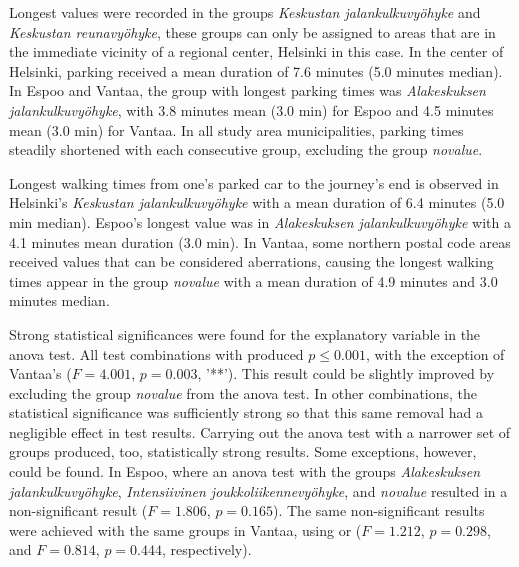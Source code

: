Longest  values were recorded in the groups \textit{Keskustan jalankulkuvyöhyke} and \textit{Keskustan reunavyöhyke}, these groups can only be assigned to areas that are in the immediate vicinity of a regional center, Helsinki in this case. In the center of Helsinki, parking received a mean duration of 7.6 minutes (5.0 minutes median). In Espoo and Vantaa, the group with longest parking times was \textit{Alakeskuksen jalankulkuvyöhyke}, with 3.8 minutes mean (3.0 min) for Espoo and 4.5 minutes mean (3.0 min) for Vantaa. In all study area municipalities, parking times steadily shortened with each consecutive group, excluding the group \textit{novalue}.

Longest walking times from one's parked car to the journey's end is observed in Helsinki's \textit{Keskustan jalankulkuvyöhyke} with a mean duration of 6.4 minutes (5.0 min median). Espoo's longest  value was in \textit{Alakeskuksen jalankulkuvyöhyke} with a 4.1 minutes mean duration (3.0 min). In Vantaa, some northern postal code areas received  values that can be considered aberrations, causing the longest walking times appear in the group \textit{novalue} with a mean duration of 4.9 minutes and 3.0 minutes median.

Strong statistical significances were found for the explanatory variable  in the \acrshort{anova} test. All test combinations with  produced $p \leq 0.001$, with the exception of Vantaa's  ($F = 4.001$, $p = 0.003$, '**'). This result could be slightly improved by excluding the group \textit{novalue} from the \acrshort{anova} test. In other combinations, the statistical significance was sufficiently strong so that this same removal had a negligible effect in test results. Carrying out the \acrshort{anova} test with a narrower set of groups produced, too, statistically strong results. Some exceptions, however, could be found. In Espoo, where an \acrshort{anova} test with the groups \textit{Alakeskuksen jalankulkuvyöhyke}, \textit{Intensiivinen joukkoliikennevyöhyke}, and \textit{novalue} resulted in a non-significant result ($F = 1.806$, $p = 0.165$). The same non-significant results were achieved with the same groups in Vantaa, using  or  ($F = 1.212$, $p = 0.298$, and $F = 	0.814$, $p = 0.444$, respectively).

